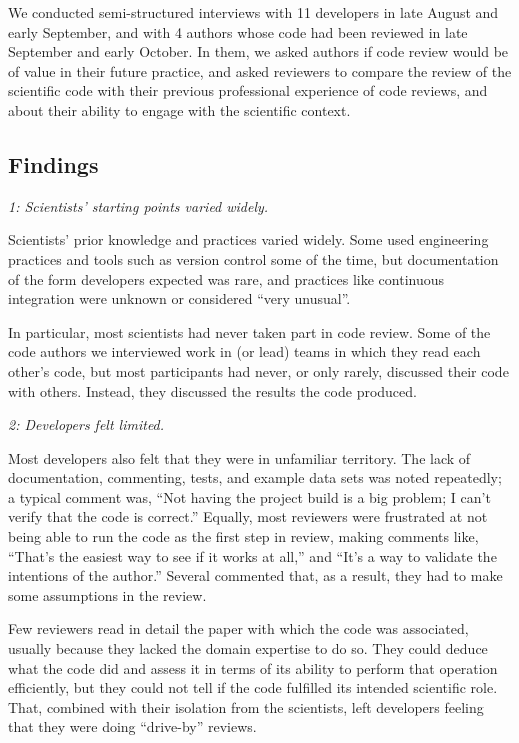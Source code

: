 \documentclass[10pt,twocolumn]{article}
\begin{document}
We conducted semi-structured interviews \cite{b:rosenthal2007,b:bryman2008} with 11 developers in late August and early September,
and with 4 authors whose code had been reviewed in late September and early October.
In them,
we asked authors if code review would be of value in their future practice,
and asked reviewers
to compare the review of the scientific code with their previous professional experience of code reviews,
and about their ability to engage with the scientific context.

\subsection{Findings}

\noindent \emph{1: Scientists' starting points varied widely.}

Scientists' prior knowledge and practices varied widely.
Some used engineering practices and tools such as version control some of the time,
but documentation of the form developers expected was rare,
and practices like continuous integration were unknown or considered ``very unusual''.

In particular,
most scientists had never taken part in code review.
Some of the code authors we interviewed work in (or lead) teams in which they read each other's code,
but most participants had never, or only rarely, discussed their code with others.
Instead, they discussed the results the code produced.

\noindent \emph{2: Developers felt limited.}

Most developers also felt that they were in unfamiliar territory.
The lack of documentation, commenting, tests, and example data sets was noted repeatedly;
a typical comment was,
``Not having the project build is a big problem; I can't verify that the code is correct.''
Equally, most reviewers were frustrated at not being able to run the code as the first step in review,
making comments like,
``That's the easiest way to see if it works at all,''
and
``It's a way to validate the intentions of the author.''
Several commented that, as a result, they had to make some assumptions in the review.

Few reviewers read in detail the paper with which the code was associated,
usually because they lacked the domain expertise to do so.
They could deduce what the code did and assess it in terms of its ability to perform that operation efficiently,
but they could not tell if the code fulfilled its intended scientific role.
That,
combined with their isolation from the scientists,
left developers feeling that they were doing ``drive-by'' reviews.
\end{document}
